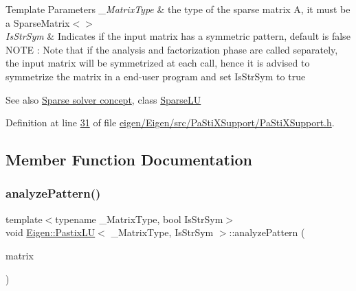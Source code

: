 \begin{DoxyTemplParams}{Template Parameters}
{\em \+\_\+\+Matrix\+Type} & the type of the sparse matrix A, it must be a Sparse\+Matrix$<$$>$ \\
\hline
{\em Is\+Str\+Sym} & Indicates if the input matrix has a symmetric pattern, default is false N\+O\+TE \+: Note that if the analysis and factorization phase are called separately, the input matrix will be symmetrized at each call, hence it is advised to symmetrize the matrix in a end-\/user program and set {\ttfamily Is\+Str\+Sym} to true\\
\hline
\end{DoxyTemplParams}


\begin{DoxySeeAlso}{See also}
\hyperlink{SparseLinearSystems.dox_TutorialSparseSolverConcept}{Sparse solver concept}, class \hyperlink{group___sparse_l_u___module_class_eigen_1_1_sparse_l_u}{Sparse\+LU} 
\end{DoxySeeAlso}


Definition at line \hyperlink{eigen_2_eigen_2src_2_pa_sti_x_support_2_pa_sti_x_support_8h_source_l00031}{31} of file \hyperlink{eigen_2_eigen_2src_2_pa_sti_x_support_2_pa_sti_x_support_8h_source}{eigen/\+Eigen/src/\+Pa\+Sti\+X\+Support/\+Pa\+Sti\+X\+Support.\+h}.



\subsection{Member Function Documentation}
\mbox{\label{class_eigen_1_1_pastix_l_u_abae3ca7f1254106d9e2d5e0f273189fa}} 
\subsubsection{\texorpdfstring{analyze\+Pattern()}{analyzePattern()}\hspace{0.1cm}{\footnotesize\ttfamily [1/2]}}
{\footnotesize\ttfamily template$<$typename \+\_\+\+Matrix\+Type, bool Is\+Str\+Sym$>$ \\
void \hyperlink{class_eigen_1_1_pastix_l_u}{Eigen\+::\+Pastix\+LU}$<$ \+\_\+\+Matrix\+Type, Is\+Str\+Sym $>$\+::analyze\+Pattern (\begin{DoxyParamCaption}\item[{const Matrix\+Type \&}]{matrix }\end{DoxyParamCaption})\hspace{0.3cm}{\ttfamily [inline]}}

